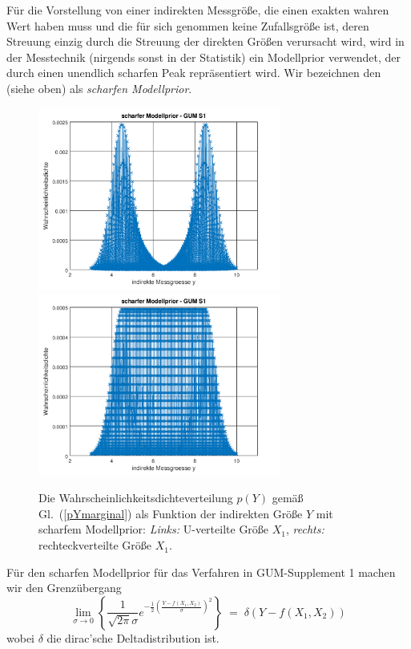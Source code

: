 Für die Vorstellung von einer indirekten Messgröße, die einen exakten wahren Wert haben muss und
die für sich genommen keine Zufallsgröße ist, deren Streuung einzig durch die Streuung der direkten
Größen verursacht wird, wird in der Messtechnik (nirgends sonst in der Statistik) ein
Modellprior verwendet, der durch einen unendlich scharfen Peak repräsentiert wird. 
Wir bezeichnen den (siehe oben) als \textsl{scharfen Modellprior}.

\begin{figure}
	\begin{center}
		\includegraphics[width=80mm]{10_vorlesung/media/indirekte_ysorted_GUMS1.png}
		\hspace{2mm}
		\includegraphics[width=80mm]{10_vorlesung/media/indirekte_ysorted_GUMS1_box.png}
		\caption{Die Wahrscheinlichkeitsdichteverteilung $p(Y)$ gemäß Gl.~(\ref{pYmarginal}) als Funktion der
			indirekten Größe $Y$ mit scharfem Modellprior:
			\textsl{Links:} U-verteilte Größe $X_1$,
			\textsl{rechts:} rechteckverteilte Größe $X_1$.}
		\label{pdfYscharf}
	\end{center}
\end{figure}

Für den scharfen Modellprior für das Verfahren in GUM-Supplement 1 machen wir den Grenzübergang
\begin{equation}
\lim_{\sigma \rightarrow 0} \left\{
\frac{1}{\sqrt{2\pi} \sigma} e^{-\frac{1}{2}\left(\frac{Y - f(X_1, X_2)}{\sigma}\right)^2}
\right\} \; = \; \delta(Y - f(X_1, X_2))
\end{equation}
wobei $\delta$ die dirac'sche Deltadistribution ist.

